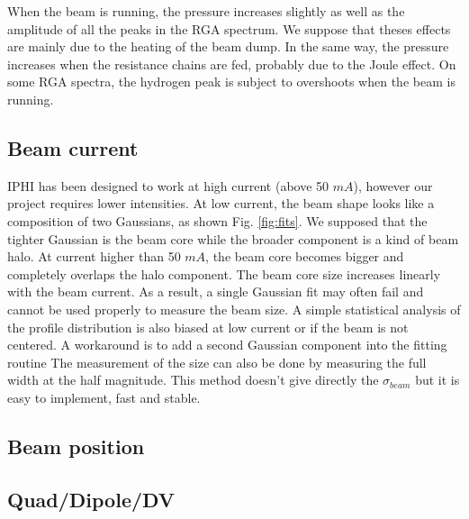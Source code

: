 \begin{refsection}
  

  When the beam is running, the pressure increases slightly as well as the amplitude of all the peaks in the RGA spectrum. We suppose that theses effects are mainly due to the heating of the beam dump. In the same way, the pressure increases when the resistance chains are fed, probably due to the Joule effect. On some RGA spectra, the hydrogen peak is subject to overshoots when the beam is running.

  \subsection{Beam current}
  IPHI has been designed to work at high current (above 50 $mA$), however our project requires lower intensities.
  At low current, the beam shape looks like a composition of two Gaussians, as shown Fig. \ref{fig:fits}.
  We supposed that the tighter Gaussian is the beam core while the broader component is a kind of beam halo.
  At current higher than 50 $mA$, the beam core becomes bigger and completely overlaps the halo component.
  The beam core size increases linearly with the beam current.
  As a result, a single Gaussian fit may often fail and cannot be used properly to measure the beam size.
  A simple statistical analysis of the profile distribution is also biased at low current or if the beam is not centered.
  A workaround is to add a second Gaussian component into the fitting routine 
  The measurement of the size can also be done by measuring the full width at the half magnitude.
  This method doesn't give directly the $\sigma_{beam}$ but it is easy to implement, fast and stable.

  
  

  \subsection{Beam position}
  
  

  

  \subsection{Quad/Dipole/DV}


\end{refsection}
